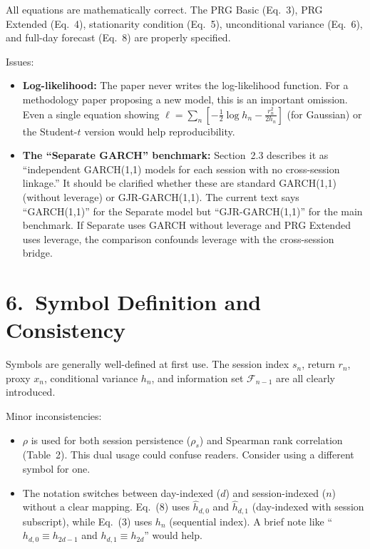 \documentclass[12pt,a4paper]{article}
\begin{document}
\textcolor{okgreen}{All equations are mathematically correct.} The PRG Basic (Eq.\ 3), PRG Extended (Eq.\ 4), stationarity condition (Eq.\ 5), unconditional variance (Eq.\ 6), and full-day forecast (Eq.\ 8) are properly specified.

\textcolor{warncolor}{Issues:}
\begin{itemize}[nosep]
\item \textbf{Log-likelihood:} The paper never writes the log-likelihood function. For a methodology paper proposing a new model, this is an important omission. Even a single equation showing $\ell = \sum_{n} [-\frac{1}{2}\log h_n - \frac{r_n^2}{2h_n}]$ (for Gaussian) or the Student-$t$ version would help reproducibility.
\item \textbf{The ``Separate GARCH'' benchmark:} Section~2.3 describes it as ``independent GARCH(1,1) models for each session with no cross-session linkage.'' It should be clarified whether these are standard GARCH(1,1) (without leverage) or GJR-GARCH(1,1). The current text says ``GARCH(1,1)'' for the Separate model but ``GJR-GARCH(1,1)'' for the main benchmark. If Separate uses GARCH without leverage and PRG Extended uses leverage, the comparison confounds leverage with the cross-session bridge.
\end{itemize}


\section*{6.\ Symbol Definition and Consistency}

\textcolor{okgreen}{Symbols are generally well-defined at first use.} The session index $s_n$, return $r_n$, proxy $x_n$, conditional variance $h_n$, and information set $\mathcal{F}_{n-1}$ are all clearly introduced.

\textcolor{warncolor}{Minor inconsistencies:}
\begin{itemize}[nosep]
\item $\rho$ is used for both session persistence ($\rho_s$) and Spearman rank correlation (Table~2). This dual usage could confuse readers. Consider using a different symbol for one.
\item The notation switches between day-indexed ($d$) and session-indexed ($n$) without a clear mapping. Eq.\ (8) uses $\hat{h}_{d,0}$ and $\hat{h}_{d,1}$ (day-indexed with session subscript), while Eq.\ (3) uses $h_n$ (sequential index). A brief note like ``$h_{d,0} \equiv h_{2d-1}$ and $h_{d,1} \equiv h_{2d}$'' would help.
\end{itemize}
\end{document}
